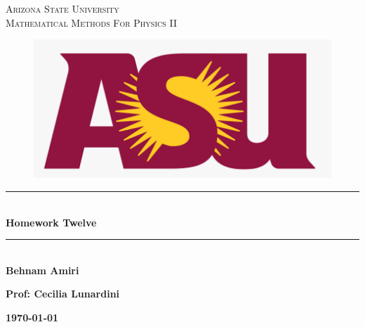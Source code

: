 \documentclass[fleqn]{article}
\begin{document}
  \begin{titlepage}

    \newcommand{\HRule}{\rule{\linewidth}{0.5mm}}

    \center



    \textsc{\LARGE Arizona State University}\\[1.5cm]

    \textsc{\LARGE Mathematical Methods For Physics II }\\[1.5cm]


    \begin{figure}
      \includegraphics[width=\linewidth]{asu.png}
    \end{figure}


    \HRule \\[0.4cm]
    { \huge \bfseries Homework Twelve}\\[0.4cm] 
    \HRule \\[1.5cm]

    \textbf{Behnam Amiri}

    \bigbreak

    \textbf{Prof: Cecilia Lunardini}

    \bigbreak


    \textbf{{\large \today}\\[2cm]}

    \vfill

  \end{titlepage}
\end{document}
